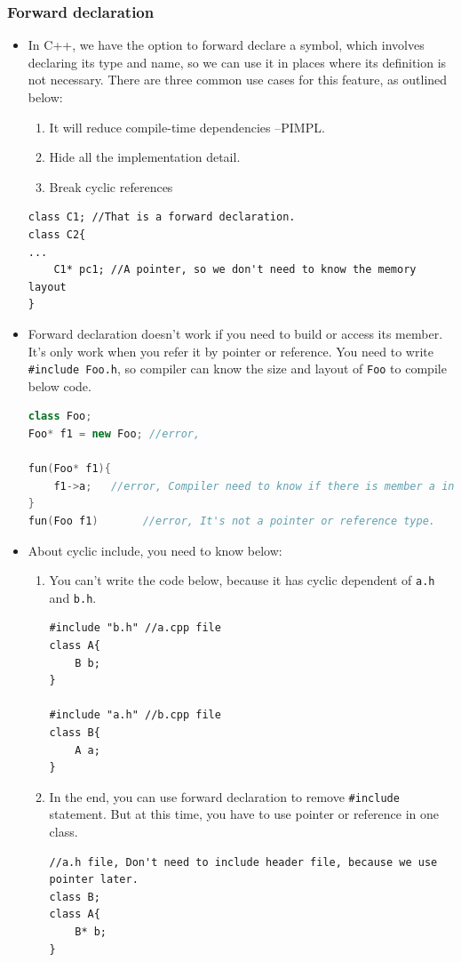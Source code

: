 \documentclass[a4paper,11pt,twoside]{book}
\begin{document}
\subsubsection{Forward declaration}
\begin{itemize}
	\item In C++, we have the option to forward declare a symbol, which involves declaring its type and name, so we can use it in places where its definition is not necessary. There are three common use cases for this feature, as outlined below:
	\begin{enumerate}
		\item It will reduce compile-time dependencies --PIMPL.
		\item Hide all the implementation detail. 
		\item Break cyclic references
	\end{enumerate}
	
\begin{lstlisting}[numbers=none]
class C1; //That is a forward declaration.
class C2{
...
	C1* pc1; //A pointer, so we don't need to know the memory layout
}
\end{lstlisting}
	
	\item Forward declaration doesn't work if you need to build or access its member. It's only work when you refer it by pointer or reference. You need to write \texttt{\#include Foo.h}, so compiler can know the size and layout of \texttt{Foo} to compile below code.
\begin{lstlisting}[frame=single, language=c++]
class Foo; 
Foo* f1 = new Foo; //error,
	
fun(Foo* f1){
	f1->a;   //error, Compiler need to know if there is member a inside of Foo
}
fun(Foo f1)       //error, It's not a pointer or reference type.
\end{lstlisting}
	
	\item About cyclic include, you need to know below:
	\begin{enumerate}
		\item You can't write the code below, because it has cyclic dependent of \texttt{a.h} and \texttt{b.h}.
\begin{lstlisting}[numbers=none]
#include "b.h" //a.cpp file
class A{
	B b;
}

#include "a.h" //b.cpp file
class B{
	A a;
}
\end{lstlisting}

		\item In the end, you can use forward declaration to remove \texttt{\#include} statement. But at this time, you have to use pointer or reference in one class.
\begin{lstlisting}[numbers=none]
//a.h file, Don't need to include header file, because we use pointer later.  
class B; 
class A{
	B* b;
}
\end{lstlisting}
	\end{enumerate}
	

\end{itemize}
\end{document}
